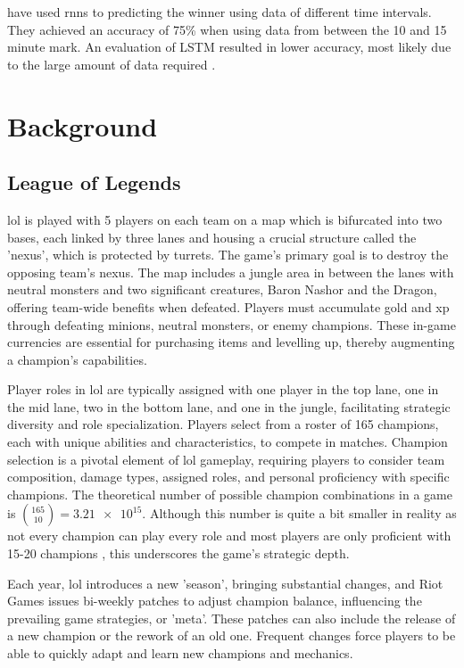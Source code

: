 \documentclass[12pt, a4paper, headinclude, twoside, plainheadsepline, open=right, numbers=noenddot, hidelinks, toc=listof, toc=bibliography]{scrreprt}
\begin{document}
 have used \acp{rnn} to predicting the winner using data of different time intervals. They achieved an accuracy of 75\% when using data from between the 10 and 15 minute mark.
An evaluation of LSTM resulted in lower accuracy, most likely due to the large amount of data required \cite{silvaContinuousOutcomePrediction2018}.

\chapter{Background}
\label{chap:background}

\section{League of Legends}
\label{sec:LoL}

\Ac{lol} is played with 5 players on each team on a map which is bifurcated into two bases, each linked by three lanes and housing a crucial structure called the 'nexus', which is protected by turrets. 
The game's primary goal is to destroy the opposing team's nexus.
The map includes a jungle area in between the lanes with neutral monsters and two significant creatures, Baron Nashor and the Dragon, offering team-wide benefits when defeated.
Players must accumulate gold and \ac{xp} through defeating minions, neutral monsters, or enemy champions. 
These in-game currencies are essential for purchasing items and levelling up, thereby augmenting a champion's capabilities.

Player roles in \ac{lol} are typically assigned with one player in the top lane, one in the mid lane, two in the bottom lane, and one in the jungle, facilitating strategic diversity and role specialization.
Players select from a roster of 165 champions, each with unique abilities and characteristics, to compete in matches.
Champion selection is a pivotal element of \ac{lol} gameplay, requiring players to consider team composition, damage types, assigned roles, and personal proficiency with specific champions. 
The theoretical number of possible champion combinations in a game is $\binom{165}{10} = \num{3.21e15}$.
Although this number is quite a bit smaller in reality as not every champion can play every role and most players are only proficient with 15-20 champions \cite{2022Recap}, this underscores the game's strategic depth.

Each year, \ac{lol} introduces a new 'season', bringing substantial changes, and Riot Games issues bi-weekly patches to adjust champion balance, influencing the prevailing game strategies, or 'meta'.
These patches can also include the release of a new champion or the rework of an old one.
Frequent changes force players to be able to quickly adapt and learn new champions and mechanics.
\end{document}
